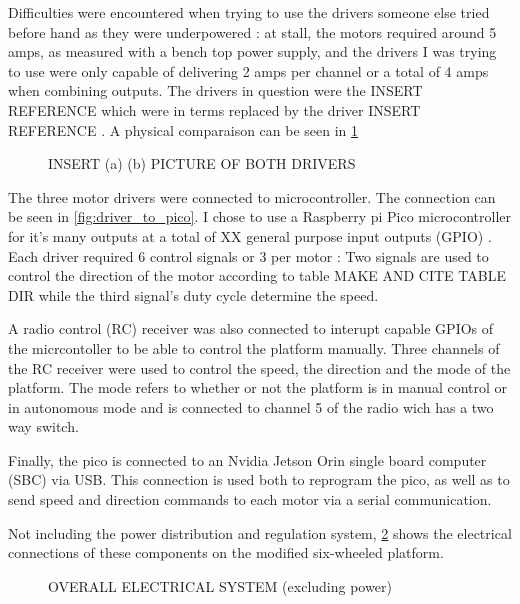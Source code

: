 \documentclass[11pt]{article}
\begin{document}
                Difficulties were encountered when trying to use the drivers someone else tried before hand as they were underpowered : at stall, the motors required around 5 amps, as measured with a bench top power supply, and the drivers I was trying to use were only capable of delivering 2 amps per channel or a total of 4 amps when combining outputs. The drivers in question were the \color{red} INSERT REFERENCE \color{black} which were in terms replaced by the driver \color{red} INSERT REFERENCE \color{black}. A physical comparaison can be seen in \ref{fig:drivers_compraison}
                
                
                \begin{figure}
                    \centering
                    INSERT (a) (b) PICTURE OF BOTH DRIVERS
                    \label{fig:drivers_compraison}
                \end{figure}

                The three motor drivers were connected to microcontroller. The connection can be seen in \ref{fig:driver_to_pico}.
                I chose to use a Raspberry pi Pico microcontroller for it's many outputs at a total of \color{red} XX general purpose input outputs (GPIO) \color{black}. Each driver required 6 control signals or 3 per motor : Two signals are used to control the direction of the motor according to table \color{red} MAKE AND CITE TABLE DIR \color{black} while the third signal's duty cycle determine the speed.

                A radio control (RC) receiver was also connected to interupt capable GPIOs of the micrcontoller to be able to control the platform manually. Three channels of the RC receiver were used to control the speed, the direction and the mode of the platform. The mode refers to whether or not the platform is in manual control or in autonomous mode and is connected to channel 5 of the radio wich has a two way switch.

                Finally, the pico is connected to an Nvidia Jetson Orin single board computer (SBC) via USB. This connection is used both to reprogram the pico, as well as to send speed and direction commands to each motor via a serial communication. 

                Not including the power distribution and regulation system, \ref{fig:overall_electical_system} shows the electrical connections of these components on the modified six-wheeled platform.

                \begin{figure}
                    \centering
                    OVERALL ELECTRICAL SYSTEM (excluding power)
                    \label{fig:overall_electical_system}
                \end{figure}
\end{document}
